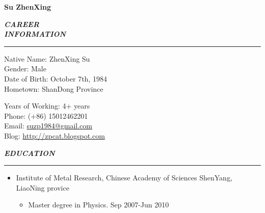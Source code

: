 \documentclass[a4paper, 10pt, titlepage]{article}
\newcommand{\wuhao}{\fontsize{10.5pt}{10.5pt}\selectfont}   %
\begin{document}
\renewcommand{\normalsize}{\wuhao}         %

\setlength{\parindent}{0em}                    
\newcommand{\mysection}[1]{\vspace{5pt} {\bfseries \textsl{#1}} \\ {\color{gray} \rule[5pt]{\textwidth}{0.3pt}}}
\renewcommand{\labelitemi}{$\bullet$}

\newcommand{\cvtitle}[1]{\centerline{\huge \textbf{#1}} \bigskip}
\newcommand{\career}[2]{\vspace{5pt} {{\bfseries \textsl{#1}} \hspace{5pt} {\normalsize{#2}}} \\}
\pagestyle{empty}

\cvtitle{Su ZhenXing}
\career{CAREER}{Linux Software Engineer}

\mysection{INFORMATION}
\begin{minipage}[t]{0.495\textwidth}
  Native Name: ZhenXing Su \\
  Gender: Male \\
  Date of Birth: October 7th, 1984\\
  Hometown: ShanDong Province
\end{minipage}
\begin{minipage}[t]{0.495\textwidth}
  Years of Working: 4+ years\\
  Phone: (+86) 15012462201 \\
  Email: \href{mailto:suzp1984@gmail.com}{suzp1984@gmail.com} \\
  Blog: \href{http://zpcat.blogspot.com}{http://zpcat.blogspot.com}
\end{minipage}

\vspace{3mm}
\mysection{EDUCATION}

\begin{itemize}

\item Institute of Metal Research, Chinese Academy of Sciences \hfill \textrm{ShenYang, LiaoNing provice}
  \begin{itemize}
    \item Master degree in Physics. \hfill \textrm{Sep 2007-Jun 2010}
  \end{itemize}
\end{itemize}
\end{document}
